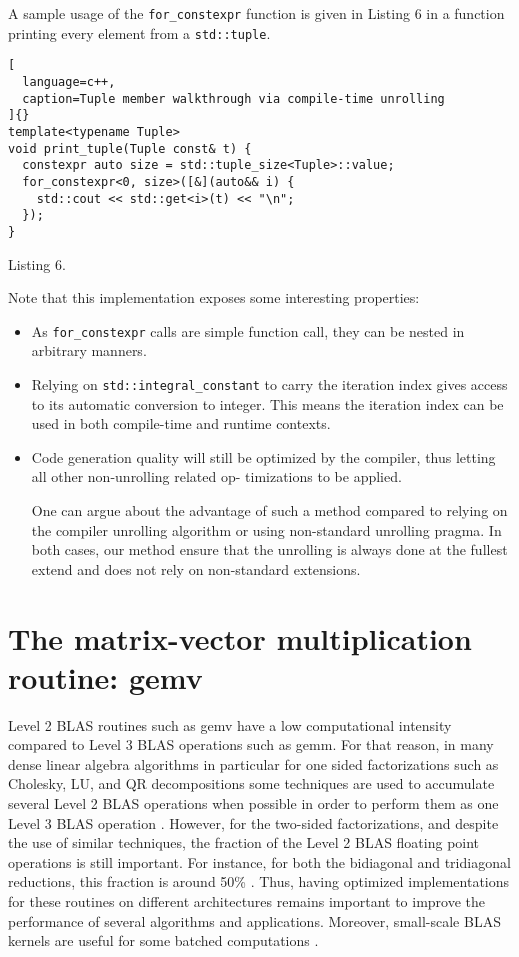 \documentclass[../main]{subfiles}
\begin{document}
A sample usage of the \lstinline{for_constexpr} function is given
in Listing 6 in a function printing every element from a
\lstinline{std::tuple}.

\begin{lstlisting}[
  language=c++,
  caption=Tuple member walkthrough via compile-time unrolling
]{}
template<typename Tuple>
void print_tuple(Tuple const& t) {
  constexpr auto size = std::tuple_size<Tuple>::value;
  for_constexpr<0, size>([&](auto&& i) {
    std::cout << std::get<i>(t) << "\n";
  });
}
\end{lstlisting}
Listing 6.

Note that this implementation exposes some interesting
properties:

\begin{itemize}
\item As \lstinline{for_constexpr} calls are simple function call, they
can be nested in arbitrary manners.

\item Relying on \lstinline{std::integral_constant} to carry the
iteration index gives access to its automatic conversion
to integer. This means the iteration index can be used in
both compile-time and runtime contexts.

\item Code generation quality will still be optimized by the
compiler, thus letting all other non-unrolling related op-
timizations to be applied.

One can argue about the advantage of such a method
compared to relying on the compiler unrolling algorithm
or using non-standard unrolling pragma. In both cases, our
method ensure that the unrolling is always done at the fullest
extend and does not rely on non-standard extensions.
\end{itemize}

\section{
  The matrix-vector multiplication routine: gemv
}

Level 2 BLAS routines such as gemv have a low
computational intensity compared to Level 3 BLAS operations
such as gemm. For that reason, in many dense linear algebra
algorithms in particular for one sided factorizations such as
Cholesky, LU, and QR decompositions some techniques are
used to accumulate several Level 2 BLAS operations when
possible in order to perform them as one Level 3 BLAS
operation \cite{hpcs18}. However, for the two-sided factorizations,
and despite the use of similar techniques, the fraction of the
Level 2 BLAS floating point operations is still important. For
instance, for both the bidiagonal and tridiagonal reductions,
this fraction is around 50\% \cite{hpcs19}. Thus, having optimized
implementations for these routines on different architectures
remains important to improve the performance of several
algorithms and applications. Moreover, small-scale BLAS
kernels are useful for some batched computations \cite{hpcs20}.
\end{document}
